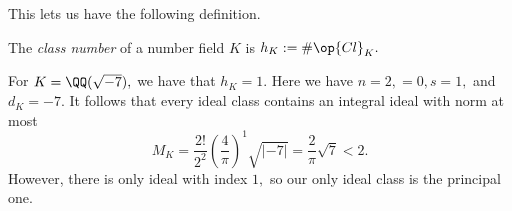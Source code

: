 \documentclass[../notes.tex]{subfiles}
\begin{document}
This lets us have the following definition.
\begin{definition}
    The \textit{class number} of a number field $K$ is $h_K:=\#\op{Cl}_K.$
\end{definition}
\begin{example}
    For $K=\QQ(\sqrt{-7}),$ we have that $h_K=1.$ Here we have $n=2,=0,s=1,$ and $d_K=-7.$ It follows that every ideal class contains an integral ideal with norm at most
    \[M_K=\frac{2!}{2^2}\left(\frac4\pi\right)^1\sqrt{|-7|}=\frac2\pi\sqrt7<2.\]
    However, there is only ideal with index $1,$ so our only ideal class is the principal one.
\end{example}
\end{document}
